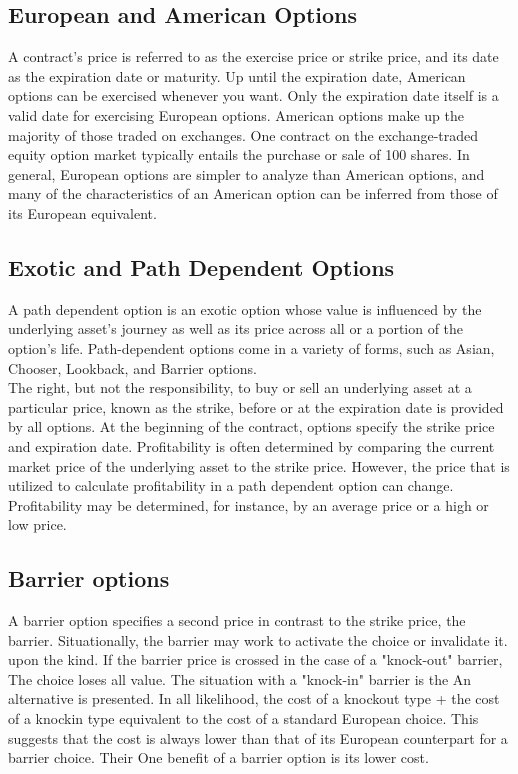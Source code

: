 \subsection{European and American Options}
A contract's price is referred to as the exercise price or strike price, and its date as the expiration date or maturity. Up until the expiration date, American options can be exercised whenever you want. Only the expiration date itself is a valid date for exercising European options. American options make up the majority of those traded on exchanges. One contract on the exchange-traded equity option market typically entails the purchase or sale of 100 shares. In general, European options are simpler to analyze than American options, and many of the characteristics of an American option can be inferred from those of its European equivalent.

\subsection{Exotic and Path Dependent Options}
A path dependent option is an exotic option whose value is influenced by the underlying asset's journey as well as its price across all or a portion of the option's life. Path-dependent options come in a variety of forms, such as Asian, Chooser, Lookback, and Barrier options.\\
The right, but not the responsibility, to buy or sell an underlying asset at a particular price, known as the strike, before or at the expiration date is provided by all options. At the beginning of the contract, options specify the strike price and expiration date. Profitability is often determined by comparing the current market price of the underlying asset to the strike price. However, the price that is utilized to calculate profitability in a path dependent option can change. Profitability may be determined, for instance, by an average price or a high or low price.


\subsection{Barrier options}
A barrier option specifies a second price in contrast to the strike price, the
barrier. Situationally, the barrier may work to activate the choice or invalidate it.
upon the kind. If the barrier price is crossed in the case of a "knock-out" barrier,
The choice loses all value. The situation with a "knock-in" barrier is the
An alternative is presented.
In all likelihood, the cost of a knockout type + the cost of a knockin type
equivalent to the cost of a standard European choice. This suggests that the cost
is always lower than that of its European counterpart for a barrier choice. Their
One benefit of a barrier option is its lower cost.

